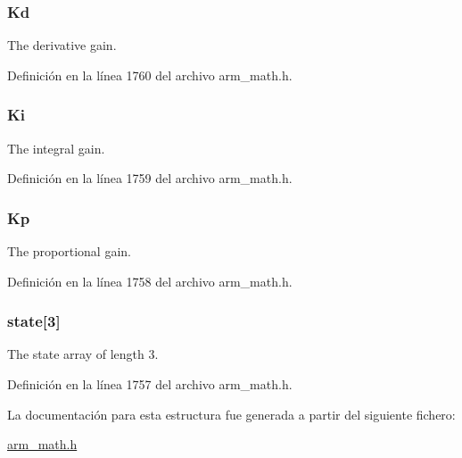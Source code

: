 \subsubsection[{\texorpdfstring{Kd}{Kd}}]{ Kd}\hypertarget{structarm__pid__instance__q31_a213bbf14da7ea536998f611977173552}{}\label{structarm__pid__instance__q31_a213bbf14da7ea536998f611977173552}
The derivative gain. 

Definición en la línea 1760 del archivo arm\+\_\+math.\+h.

\subsubsection[{\texorpdfstring{Ki}{Ki}}]{ Ki}\hypertarget{structarm__pid__instance__q31_a84a6c05c16369c905193da0d5fc9a7b0}{}\label{structarm__pid__instance__q31_a84a6c05c16369c905193da0d5fc9a7b0}
The integral gain. 

Definición en la línea 1759 del archivo arm\+\_\+math.\+h.

\subsubsection[{\texorpdfstring{Kp}{Kp}}]{ Kp}\hypertarget{structarm__pid__instance__q31_a6ec4b37fe2246a7e017dd07578fe5bbd}{}\label{structarm__pid__instance__q31_a6ec4b37fe2246a7e017dd07578fe5bbd}
The proportional gain. 

Definición en la línea 1758 del archivo arm\+\_\+math.\+h.

\subsubsection[{\texorpdfstring{state}{state}}]{ state\mbox{[}3\mbox{]}}\hypertarget{structarm__pid__instance__q31_af0a2da4da9a94af652873ec7e7be4880}{}\label{structarm__pid__instance__q31_af0a2da4da9a94af652873ec7e7be4880}
The state array of length 3. 

Definición en la línea 1757 del archivo arm\+\_\+math.\+h.



La documentación para esta estructura fue generada a partir del siguiente fichero\+:\begin{DoxyCompactItemize}
\item 
\hyperlink{arm__math_8h}{arm\+\_\+math.\+h}\end{DoxyCompactItemize}
